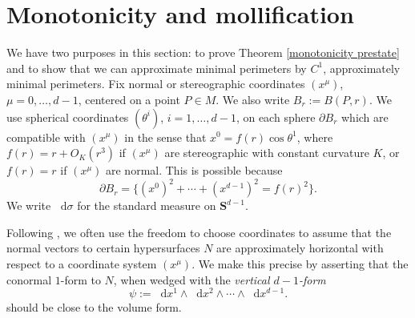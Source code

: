 \documentclass[reqno,10pt]{amsart}
\newcommand{\ZZ}{\mathbf{Z}}
\newcommand{\Sph}{\mathbf S}
\newcommand*\dif{\mathop{}\!\mathrm{d}}
\newcommand{\dfn}[1]{\emph{#1}\index{#1}}
\newtheorem{proposition}[theorem]{Proposition}
\theoremstyle{definition}
\numberwithin{equation}{section}
\begin{document}


\section{Monotonicity and mollification}\label{MollifierSection}
We have two purposes in this section: to prove Theorem \ref{monotonicity prestate} and to show that we can approximate minimal perimeters by $C^1$, approximately minimal perimeters.
Fix normal or stereographic coordinates $(x^\mu)$, $\mu = 0, \dots, d - 1$, centered on a point $P \in M$.
We also write $B_r := B(P, r)$.
We use spherical coordinates $(\theta^i)$, $i = 1, \dots, d - 1$, on each sphere $\partial B_r$ which are compatible with $(x^\mu)$ in the sense that $x^0 = f(r) \cos \theta^1$, where $f(r) = r + O_K(r^3)$ if $(x^\mu)$ are stereographic with constant curvature $K$, or $f(r) = r$ if $(x^\mu)$ are normal.
This is possible because
\begin{equation}\label{partial Br is a variety}
\partial B_r = \{(x^0)^2 + \cdots + (x^{d - 1})^2 = f(r)^2\}.
\end{equation}
We write $\dif \sigma$ for the standard measure on $\Sph^{d - 1}$.

Following \cite{Giusti77}, we often use the freedom to choose coordinates to assume that the normal vectors to certain hypersurfaces $N$ are approximately horizontal with respect to a coordinate system $(x^\mu)$.
We make this precise by asserting that the conormal $1$-form to $N$, when wedged with the \dfn{vertical $d-1$-form}
\begin{equation}\label{d1 form}
\psi := \dif x^1 \wedge \dif x^2 \wedge \cdots \wedge \dif x^{d - 1}.
\end{equation}
should be close to the volume form.
\end{document}

